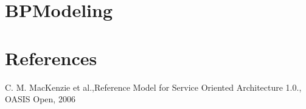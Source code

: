 \documentclass[10pt,a4paper]{article}
\begin{document}
\section{BPModeling}
\section{\LARGE References}
\begin{enumerate}[label={[\arabic*]}]
  \item C. M. MacKenzie et al.,Reference Model for Service Oriented
Architecture 1.0., OASIS Open, 2006
\end{enumerate}
\end{document}
